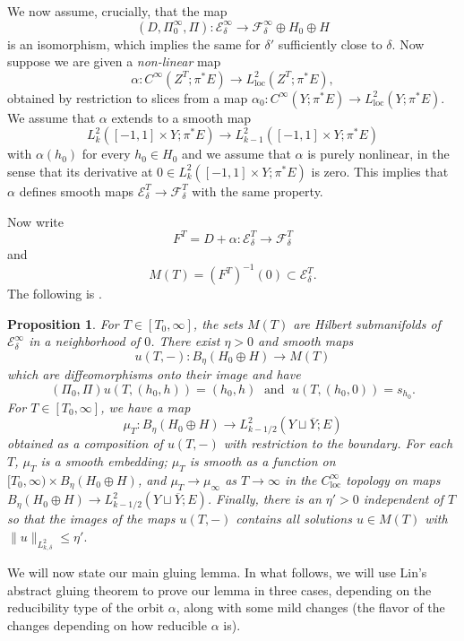 \documentclass[10pt,a4paper]{amsart}
\newcommand{\pE}{\pi^* \! E}
\newtheorem{proposition}[theorem]{Proposition}
\theoremstyle{definition}
\theoremstyle{remark}
\numberwithin{figure}{qchap}
\begin{document}
We now assume, crucially, that the map $$(D, \Pi^\infty_0, \Pi): \mathcal E^\infty_\delta \to \mathcal F^\infty_\delta \oplus H_0 \oplus H$$ is an isomorphism, which implies the same for $\delta'$ sufficiently close to $\delta$. Now suppose we are given a \emph{non-linear} map 
$$\alpha: C^\infty(Z^T;\pE) \to L^2_{\text{loc}}(Z^T;\pE),$$ 
obtained by restriction to slices from a map $\alpha_0: C^\infty(Y;\pE) \to L^2_{\text{loc}}(Y;\pE)$. We assume that $\alpha$ extends to a smooth map 
$$L^2_k([-1,1] \times Y; \pE) \to L^2_{k-1}([-1,1] \times Y; \pE)$$ 
with $\alpha(h_0)$ for every $h_0 \in H_0$ and we assume that $\alpha$ is purely nonlinear, in the sense that its derivative at $0 \in L^2_k([-1,1] \times Y;\pE)$ is zero. This implies that $\alpha$ defines smooth maps $\mathcal E_\delta^T \to \mathcal F_\delta^T$ with the same property.

Now write $$F^T = D + \alpha: \mathcal E^T_\delta \to \mathcal F^T_\delta$$ and $$M(T) = \left(F^T\right)^{-1}(0) \subset \mathcal E_\delta^T.$$ The following is \cite[Proposition~3.5.15]{Lin}.

\begin{proposition}For $T \in [T_0, \infty]$, the sets $M(T)$ are Hilbert submanifolds of $\mathcal E^\infty_\delta$ in a neighborhood of $0$. There exist $\eta > 0$ and smooth maps $$u(T, -): B_\eta(H_0 \oplus H) \to M(T)$$ which are diffeomorphisms onto their image and have $$(\Pi_0, \Pi) u(T, (h_0, h)) = (h_0, h) \; \text{ and } \; u(T, (h_0, 0)) = s_{h_0}.$$ For $T \in [T_0, \infty]$, we have a map $$\mu_T: B_\eta(H_0 \oplus H) \to L^2_{k-1/2}(Y \sqcup \overline Y;E)$$ obtained as a composition of $u(T, -)$ with restriction to the boundary. For each $T$, $\mu_T$ is a smooth embedding; $\mu_T$ is smooth as a function on $[T_0, \infty) \times B_\eta(H_0 \oplus H)$, and $\mu_T \to \mu_\infty$ as $T \to \infty$ in the $C^\infty_{\text{loc}}$ topology on maps $B_\eta(H_0 \oplus H) \to L^2_{k-1/2}(Y \sqcup \overline Y;E)$. Finally, there is an $\eta' > 0$ independent of $T$ so that the images of the maps $u(T, -)$ contains all solutions $u \in M(T)$ with $\|u\|_{L^2_{k,\delta}} \leq \eta'.$
\end{proposition}

We will now state our main gluing lemma. In what follows, we will use Lin's abstract gluing theorem to prove our lemma in three cases, depending on the reducibility type of the orbit $\alpha$, along with some mild changes (the flavor of the changes depending on how reducible $\alpha$ is).
\end{document}
